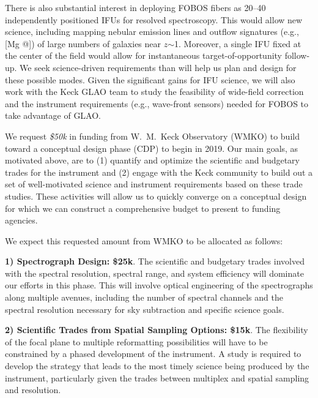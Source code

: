 \documentclass[11pt,letterpaper]{article}
\makeatletter
\newcommand*{\rom}[1]{\expandafter\@slowromancap\romannumeral #1@}
\makeatother
\begin{document}
There is also substantial interest in deploying FOBOS fibers as 20--40
independently positioned IFUs for resolved spectroscopy.  This would
allow new science, including mapping nebular emission lines and outflow
signatures (e.g., [Mg {\small \rom{2}}]) of large numbers of galaxies
near $z$$\sim$1.   Moreover, a single IFU fixed at the center of the
field would allow for instantaneous target-of-opportunity follow-up.
We seek science-driven requirements than will help us plan and design
for these possible modes.  Given the significant gains for IFU science,
we will also work with the Keck GLAO team to study the feasibility of
wide-field correction and the instrument requirements (e.g., wave-front
sensors) needed for FOBOS to take advantage of GLAO.
\smallskip



 We request \emph{\$50k} in funding from
W.~M.\ Keck Observatory (WMKO) to build toward a conceptual design phase
(CDP) to begin in 2019.  Our main goals, as motivated above, are to (1)
quantify and optimize the scientific and budgetary trades for the
instrument and (2) engage with the Keck community to build out a set of
well-motivated science and instrument requirements based on these trade
studies.  These activities will allow us to quickly converge on a
conceptual design for which we can construct a comprehensive budget to
present to funding agencies.
\medskip

\noindent We expect this requested amount from WMKO to be allocated as
follows:

{\bf 1) Spectrograph Design: \$25k}.  The scientific and budgetary
trades involved with the spectral resolution, spectral range, and system
efficiency will dominate our efforts in this phase.  This will involve
optical engineering of the spectrographs along multiple avenues,
including the number of spectral channels and the spectral resolution
necessary for sky subtraction and specific science goals.

{\bf 2) Scientific Trades from Spatial Sampling Options: \$15k}.  The
flexibility of the focal plane to multiple reformatting possibilities
will have to be constrained by a phased development of the instrument.
A study is required to develop the strategy that leads to the most
timely science being produced by the instrument, particularly given the
trades between multiplex and spatial sampling and resolution.
\end{document}
